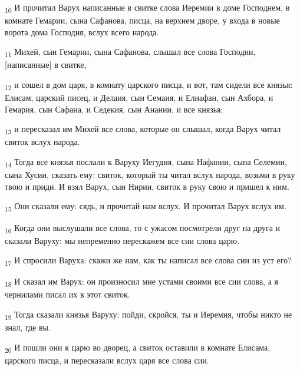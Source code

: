 \begin{tcolorbox}
\textsubscript{10} И прочитал Варух написанные в свитке слова Иеремии в доме Господнем, в комнате Гемарии, сына Сафанова, писца, на верхнем дворе, у входа в новые ворота дома Господня, вслух всего народа.
\end{tcolorbox}
\begin{tcolorbox}
\textsubscript{11} Михей, сын Гемарии, сына Сафанова, слышал все слова Господни, [написанные] в свитке,
\end{tcolorbox}
\begin{tcolorbox}
\textsubscript{12} и сошел в дом царя, в комнату царского писца, и вот, там сидели все князья: Елисам, царский писец, и Делаия, сын Семаия, и Елнафан, сын Ахбора, и Гемария, сын Сафана, и Седекия, сын Анании, и все князья;
\end{tcolorbox}
\begin{tcolorbox}
\textsubscript{13} и пересказал им Михей все слова, которые он слышал, когда Варух читал свиток вслух народа.
\end{tcolorbox}
\begin{tcolorbox}
\textsubscript{14} Тогда все князья послали к Варуху Иегудия, сына Нафании, сына Селемии, сына Хусии, сказать ему: свиток, который ты читал вслух народа, возьми в руку твою и приди. И взял Варух, сын Нирии, свиток в руку свою и пришел к ним.
\end{tcolorbox}
\begin{tcolorbox}
\textsubscript{15} Они сказали ему: сядь, и прочитай нам вслух. И прочитал Варух вслух им.
\end{tcolorbox}
\begin{tcolorbox}
\textsubscript{16} Когда они выслушали все слова, то с ужасом посмотрели друг на друга и сказали Варуху: мы непременно перескажем все сии слова царю.
\end{tcolorbox}
\begin{tcolorbox}
\textsubscript{17} И спросили Варуха: скажи же нам, как ты написал все слова сии из уст его?
\end{tcolorbox}
\begin{tcolorbox}
\textsubscript{18} И сказал им Варух: он произносил мне устами своими все сии слова, а я чернилами писал их в этот свиток.
\end{tcolorbox}
\begin{tcolorbox}
\textsubscript{19} Тогда сказали князья Варуху: пойди, скройся, ты и Иеремия, чтобы никто не знал, где вы.
\end{tcolorbox}
\begin{tcolorbox}
\textsubscript{20} И пошли они к царю во дворец, а свиток оставили в комнате Елисама, царского писца, и пересказали вслух царя все слова сии.
\end{tcolorbox}
